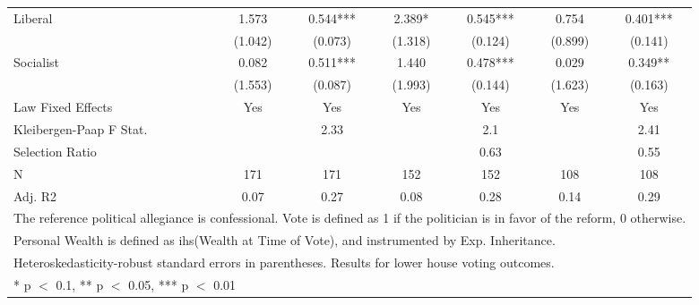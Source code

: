 \begin{table}
\begin{tabular}[t]{lcccccc}
Liberal & \num{1.573} & \num{0.544}*** & \num{2.389}* & \num{0.545}*** & \num{0.754} & \num{0.401}***\\
 & (\num{1.042}) & (\num{0.073}) & (\num{1.318}) & (\num{0.124}) & (\num{0.899}) & (\num{0.141})\\
Socialist & \num{0.082} & \num{0.511}*** & \num{1.440} & \num{0.478}*** & \num{0.029} & \num{0.349}**\\
 & (\num{1.553}) & (\num{0.087}) & (\num{1.993}) & (\num{0.144}) & (\num{1.623}) & (\num{0.163})\\
\midrule
Law Fixed Effects & Yes & Yes & Yes & Yes & Yes & Yes\\
Kleibergen-Paap F Stat. &  & 2.33 &  & 2.1 &  & 2.41\\
Selection Ratio &  &  &  & 0.63 &  & 0.55\\
N & \num{171} & \num{171} & \num{152} & \num{152} & \num{108} & \num{108}\\
Adj. R2 & \num{0.07} & \num{0.27} & \num{0.08} & \num{0.28} & \num{0.14} & \num{0.29}\\
\bottomrule
\multicolumn{7}{l}{\rule{0pt}{1em}The reference political allegiance is confessional. Vote is defined as 1 if the politician is in favor of the reform, 0 otherwise.}\\
\multicolumn{7}{l}{\rule{0pt}{1em}Personal Wealth is defined as ihs(Wealth at Time of Vote), and instrumented by Exp. Inheritance.}\\
\multicolumn{7}{l}{\rule{0pt}{1em}Heteroskedasticity-robust standard errors in parentheses. Results for lower house voting outcomes.}\\
\multicolumn{7}{l}{\rule{0pt}{1em}* p $<$ 0.1, ** p $<$ 0.05, *** p $<$ 0.01}\\
\end{tabular}
\end{table}
